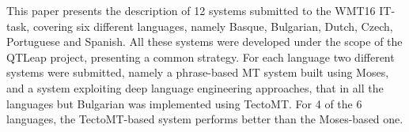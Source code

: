 This paper presents the description of 12 systems  submitted to the WMT16 IT-task, covering six different languages, namely Basque, Bulgarian, Dutch, Czech, Portuguese and Spanish. All these systems were developed under the scope of the QTLeap project, presenting a common strategy. For each language two different systems were submitted, namely a phrase-based MT system built using Moses, and a system exploiting deep language engineering approaches, that in all the languages but Bulgarian was implemented using TectoMT. For 4 of the 6 languages, the TectoMT-based system performs better than the Moses-based one.
